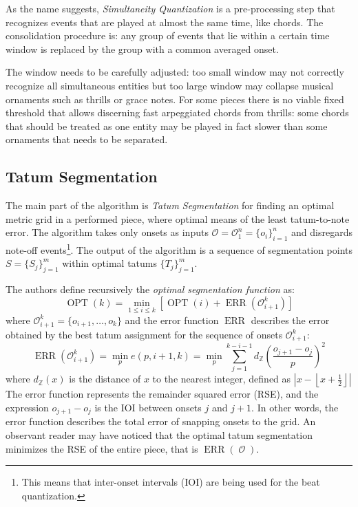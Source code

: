 As the name suggests, \emph{Simultaneity Quantization} is a pre-processing step that recognizes events that are played at almost the same time, like chords. The consolidation procedure is: any group of events that lie within a certain time window is replaced by the group with a common averaged onset. 

The window needs to be carefully adjusted: too small window may not correctly recognize all simultaneous entities but too large window may collapse musical ornaments such as thrills or grace notes. For some pieces there is no viable fixed threshold that allows discerning fast arpeggiated chords from thrills: some chords that should be treated as one entity may be played in fact slower than some ornaments that needs to be separated.

\subsection{Tatum Segmentation}

The main part of the algorithm is \emph{Tatum Segmentation} for finding an optimal metric grid in a performed piece, where optimal means of the least tatum-to-note error. The algorithm takes only onsets as inputs $\mathcal{O}=\mathcal{O}_1^n=\{o_i\}_{i=1}^n$ and disregards note-off events\footnote{This means that inter-onset intervals (IOI) are being used for the beat quantization.}. The output of the algorithm is a sequence of segmentation points $S=\{S_j\}_{j=1}^m$ within optimal tatums $\{T_j\}_{j=1}^m$.

The authors define recursively the \emph{optimal segmentation function} as: $$\operatorname{OPT}(k) = \min_{1\leq i \leq k}\left[\operatorname{OPT}(i) + \operatorname{ERR}\left(\mathcal{O}_{i+1}^k\right)\right]$$ where $\mathcal{O}_{i+1}^k=\{o_{i+1},\ldots,o_k\}$ and the error function $\operatorname{ERR}$ describes the error obtained by the best tatum assignment for the sequence of onsets $\mathcal{O}_{i+1}^k$: $$\operatorname{ERR}\left(\mathcal{O}_{i+1}^k\right)=\min_p e\left(p,i+1,k\right)=\min_p \sum_{j=1}^{k-i-1}d_{\mathbb{Z}}\left(\frac{o_{j+1}-o_j}{p}\right)^2$$ where $d_{\mathbb{Z}}(x)$ is the distance of $x$ to the nearest integer, defined as $\left|x - \left\lfloor x + \tfrac{1}{2}\right\rfloor\right|$ The error function represents the remainder squared error (RSE), and the expression $o_{j+1}-o_j$ is the IOI between onsets $j$ and $j+1$. In other words, the error function describes the total error of snapping onsets to the grid. An observant reader may have noticed that the optimal tatum segmentation minimizes the RSE of the entire piece, that is $\operatorname{ERR}\left(\operatorname{\mathcal{O}}\right)$. 

